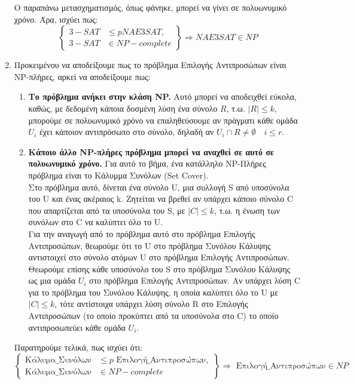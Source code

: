 \documentclass{article}
\begin{document}
\begin{enumerate}[label=(\alph*)]
\begin{itemize}
\end{itemize}
Ο παραπάνω μετασχηματισμός, όπως φάνηκε, μπορεί να γίνει σε πολυωνυμικό χρόνο. Άρα, ισχύει πως: 
\begin{equation}
\left\{
\begin{aligned}
3-SAT &\leq p NAE3SAT, \\
3-SAT &\in NP-complete
\end{aligned}
\right\} \Rightarrow NAE3SAT \in NP 
\end{equation}
\item Προκειμένου να αποδείξουμε πως το πρόβλημα Επιλογής Αντιπροσώπων είναι NP-πλήρες, αρκεί να αποδείξουμε πως: 
\begin{enumerate}[label=\arabic*]
\item \textbf{Το πρόβλημα ανήκει στην κλάση NP.} Αυτό μπορεί να αποδειχθεί εύκολα, καθώς, με δεδομένη κάποια δοσμένη λύση ένα σύνολο $R$, τ.ω. $|R| \leq k$, μπορούμε  σε πολυωνυμικό χρόνο να επαληθεύσουμε αν πράγματι κάθε ομάδα $U_i$ έχει κάποιον αντιπρόσωπο στο σύνολο, δηλαδή αν $U_i \cap R \neq \emptyset \quad i \leq r$. 
\item \textbf{Κάποιο άλλο NP-πλήρες πρόβλημα μπορεί να αναχθεί σε αυτό σε πολυωνυμικό χρόνο.} Για αυτό το βήμα, ένα κατάλληλο NP-Πλήρες πρόβλημα είναι το Κάλυμμα Συνόλων (Set Cover). \\
Στο πρόβλημα αυτό, δίνεται ένα σύνολο U, μια συλλογή S από υποσύνολα του U και ένας ακέραιος k. Ζητείται να βρεθεί αν υπάρχει κάποιο σύνολο C που απαρτίζεται  από τα υποσύνολα του S, με $|C| \leq k$, τ.ω. η ένωση των συνόλων στο C να καλύπτει όλο το U.  \\
Για την αναγωγή από το πρόβλημα αυτό στο πρόβλημα Επιλογής Αντιπροσώπων, θεωρούμε ότι το U στο πρόβλημα Συνόλου Κάλυψης αντιστοιχεί στο σύνολο ατόμων U στο πρόβλημα Επιλογής Αντιπροσώπων. Θεωρούμε επίσης κάθε υποσύνολο του S στο πρόβλημα Συνόλου Κάλυψης ως μια ομάδα $U_i$ στο πρόβλημα Επιλογής Αντιπροσώπων. Αν υπάρχει λύση C για το πρόβλημα του Συνόλου Κάλυψης, η οποία καλύπτει όλο το U με $|C| \leq k$, τότε αντίστοιχα υπάρχει λύση σύνολο R στο Επιλογής Αντιπροσώπων (το οποίο προκύπτει από τα υποσύνολα στο C) το οποίο αντιπροσωπεύει κάθε ομάδα $U_i$. 
\end{enumerate}
Παρατηρούμε τελικά, πως ισχύει ότι: \\
\begin{equation}
\left\{
\begin{aligned}
\text{Κάλυμα\_Συνόλων} &\leq p \text{ Επιλογή\_Αντιπροσώπων} , \\
\text{Κάλυμα\_Συνόλων} &\in NP-complete
\end{aligned}
\right\} \Rightarrow \text{ Επιλογή\_Αντιπροσώπων} \in NP 
\end{equation}
\end{enumerate}
\end{document}

